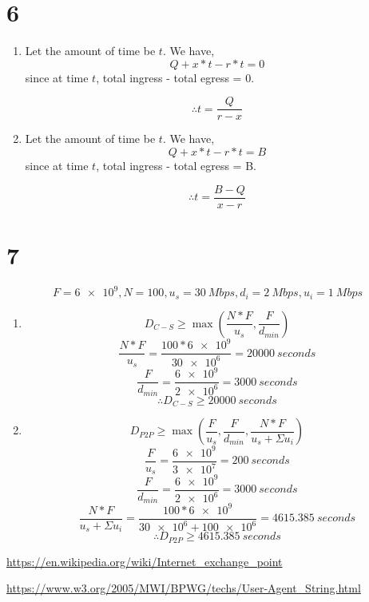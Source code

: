 \section*{6}
\begin{enumerate}
  \item Let the amount of time be $t$. We have,
  $$Q + x*t - r*t = 0$$
  since at time $t$, total ingress - total egress = 0.
  
  $$\therefore t = \frac{Q}{r - x}$$
  
  \item Let the amount of time be $t$. We have,
  $$Q + x*t - r*t = B$$
  since at time $t$, total ingress - total egress = B.
  
  $$\therefore t = \frac{B - Q}{x - r}$$
\end{enumerate}

\section*{7}
$$F = \num{6e9}, N = 100, u_s = \SI{30}{Mbps}, d_i = \SI{2}{Mbps}, u_i = \SI{1}{Mbps}$$
\begin{enumerate}
    \item $$D_{C-S} \geq \max(\frac{N*F}{u_s}, \frac{F}{d_{min}})$$
          $$\frac{N*F}{u_s} = \frac{100 * \num{6e9}}{\num{30e6}} = \SI{20000}{seconds}$$
          $$\frac{F}{d_{min}} = \frac{\num{6e9}}{\num{2e6}} = \SI{3000}{seconds}$$
          $$\therefore D_{C-S} \geq \SI{20000}{seconds}$$
          
    \item $$D_{P2P} \geq \max(\frac{F}{u_s}, \frac{F}{d_{min}}, \frac{N*F}{u_s + \Sigma u_i})$$
          $$\frac{F}{u_s} = \frac{\num{6e9}}{\num{3e7}} = \SI{200}{seconds}$$
          $$\frac{F}{d_{min}} = \frac{\num{6e9}}{\num{2e6}} = \SI{3000}{seconds}$$
          $$\frac{N*F}{u_s + \Sigma u_i} = \frac{100*\num{6e9}}{\num{30e6} + \num{100e6}} = \SI{4615.385}{seconds}$$
          $$\therefore D_{P2P} \geq \SI{4615.385}{seconds}$$
\end{enumerate}

\begin{thebibliography}{9}
\url{https://en.wikipedia.org/wiki/Internet_exchange_point}

\url{https://www.w3.org/2005/MWI/BPWG/techs/User-Agent_String.html}
\end{thebibliography}